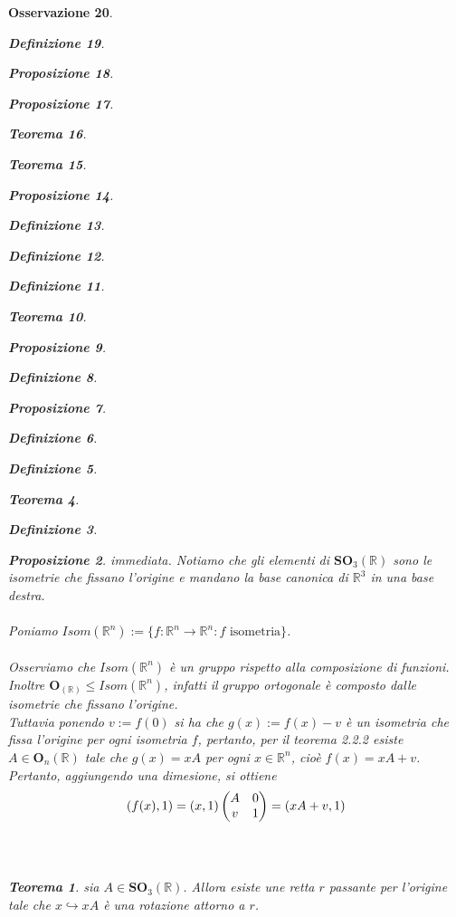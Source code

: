 \documentclass[oneside, 11pt]{amsbook}
\makeatletter
\newcommand{\0}{{(0)}}
\newcommand{\3}{{(3)}}
\theoremstyle{colonplain}
\newtheorem{thm}{Teorema}[chapter]
\newtheorem{prop}[thm]{Proposizione}
\theoremstyle{colondefinition}
\newtheorem{defn}[thm]{Definizione}
\theoremstyle{colonremark}
\newtheorem{rmk}[thm]{Osservazione}
\numberwithin{equation}{chapter}
\renewcommand{\proofname}{Dimostrazione}
\renewenvironment{proof}[1][\proofname]{\par
  \pushQED{\end{proof}}%
  \normalfont \topsep6\p@\@plus6\p@\relax
  \trivlist
  \item[\hskip\labelsep\bfseries #1:]\ignorespaces
}{%
  \popQED\endtrivlist\@endpefalse
}
\makeatother
\begin{document}
\begin{rmk}
\begin{defn}
\begin{prop}
\begin{prop}
\begin{thm}
\begin{thm}
\begin{prop}
\begin{defn}
\begin{defn}
\begin{defn}
\begin{thm}
\begin{prop}
\begin{defn}
\begin{prop}
\begin{defn}
\begin{defn}
\begin{thm}
\begin{defn}
\begin{prop}
\begin{proof} immediata. \end{proof}
Notiamo che gli elementi di $\mathbf{SO}_3(\mathbb{R})$ sono le isometrie che fissano l'origine e mandano la base canonica di $\mathbb{R}^3$ in una base destra. \\ \\
Poniamo $Isom(\mathbb{R}^n) := \{ f : \mathbb{R}^n \longrightarrow \mathbb{R}^n : f \text{ isometria} \}$. \\ \\
Osserviamo che $Isom(\mathbb{R}^n)$ è un gruppo rispetto alla composizione di funzioni. Inoltre $\mathbf{O}_(\mathbb{R}) \leq Isom(\mathbb{R}^n)$, infatti il gruppo ortogonale è composto dalle isometrie che fissano l'origine.  \\
Tuttavia ponendo $v := f(0)$ si ha che $g(x) := f(x) - v$ è un isometria che fissa l'origine per ogni isometria $f$, pertanto, per il \textit{teorema 2.2.2} esiste $A \in \mathbf{O}_n(\mathbb{R})$ tale che $g(x) = xA$ per ogni $x \in \mathbb{R}^n$, cioè $f(x) = xA + v$. \\
Pertanto, aggiungendo una dimesione, si ottiene
\begin{align}
    (f(x), 1) = (x, 1) \begin{pmatrix}
        A & 0 \\
        v & 1 
    \end{pmatrix}
    = (xA + v, 1) \notag
\end{align} \\ \\
\begin{thm} sia $A \in \mathbf{SO}_3(\mathbb{R})$. Allora esiste une retta $r$ passante per l'origine tale che $x \hookrightarrow xA$ è una rotazione attorno a $r$. \\


\end{thm}
\end{prop}
\end{defn}
\end{thm}
\end{defn}
\end{defn}
\end{prop}
\end{defn}
\end{prop}
\end{thm}
\end{defn}
\end{defn}
\end{defn}
\end{prop}
\end{thm}
\end{thm}
\end{prop}
\end{prop}
\end{defn}
\end{rmk}
\end{document}
